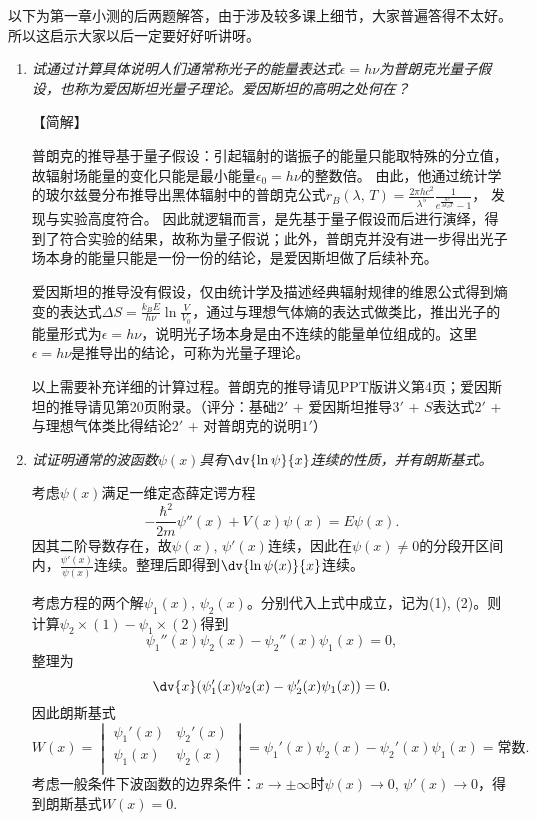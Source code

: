 以下为第一章小测的后两题解答，由于涉及较多课上细节，大家普遍答得不太好。{\color{red}所以这启示大家以后一定要好好听讲呀。}

\begin{enumerate}[label=1.\Alph*]
\item
\emph{试通过计算具体说明人们通常称光子的能量表达式$\epsilon=h\nu$为普朗克光量子假设，也称为爱因斯坦光量子理论。爱因斯坦的高明之处何在？}

【简解】

普朗克的推导基于量子假设：引起辐射的谐振子的能量只能取特殊的分立值，故辐射场能量的变化只能是最小能量$\epsilon_0=h\nu$的整数倍。
由此，他通过统计学的玻尔兹曼分布推导出黑体辐射中的普朗克公式$r_B(\lambda,\,T) = \frac{2\pi hc^2}{\lambda^5} \frac{1}{e^{\frac{hc}{\lambda k_B T}}-1}$，
发现与实验高度符合。
因此就逻辑而言，是先基于量子假设而后进行演绎，得到了符合实验的结果，故称为量子假说；此外，普朗克并没有进一步得出光子场本身的能量只能是一份一份的结论，是爱因斯坦做了后续补充。

爱因斯坦的推导没有假设，仅由统计学及描述经典辐射规律的维恩公式得到熵变的表达式$\Delta S=\frac{k_B E}{h\nu}\ln\frac{V}{V_0}$，通过与理想气体熵的表达式做类比，推出光子的能量形式为$\epsilon=h\nu$，说明光子场本身是由不连续的能量单位组成的。这里$\epsilon=h\nu$是推导出的结论，可称为光量子理论。

{\color{red}以上需要补充详细的计算过程。}普朗克的推导请见PPT版讲义第4页；爱因斯坦的推导请见第20页附录。（评分：基础$2'$ + 爱因斯坦推导$3'$ + $S$表达式$2'$ + 与理想气体类比得结论$2'$ + 对普朗克的说明$1'$）


\item
\emph{试证明通常的波函数$\psi(x)$具有$\dv{\ln\psi}{x}$连续的性质，并有朗斯基式。}

考虑$\psi(x)$满足一维定态薛定谔方程
\[-\frac{\hbar^2}{2m}\psi''(x) + V(x)\psi(x) = E\psi(x).\]
因其二阶导数存在，故$\psi(x),\,\psi'(x)$连续，因此在$\psi(x)\neq 0$的分段开区间内，$\frac{\psi'(x)}{\psi(x)}$连续。整理后即得到$\dv{\ln\psi(x)}{x}$连续。

考虑方程的两个解$\psi_1(x),\,\psi_2(x)$。分别代入上式中成立，记为(1), (2)。则计算$\psi_2\times(1)-\psi_1\times(2)$得到
\[\psi_1''(x)\psi_2(x) - \psi_2''(x)\psi_1(x) = 0,\]
整理为
\[\dv{x}(\psi_1'(x)\psi_2(x) - \psi_2'(x)\psi_1(x))=0.\]
因此朗斯基式
\[W(x) = 
\begin{vmatrix}
\psi_1'(x) & \psi_2'(x)\\
\psi_1(x) & \psi_2(x)\\
\end{vmatrix} = 
\psi_1'(x)\psi_2(x) - \psi_2'(x)\psi_1(x) = \text{常数}.\]
考虑一般条件下波函数的边界条件：$x\rightarrow \pm \infty$时$\psi(x)\rightarrow 0$, $\psi'(x)\rightarrow 0$，得到朗斯基式$W(x)=0$.


\end{enumerate}
